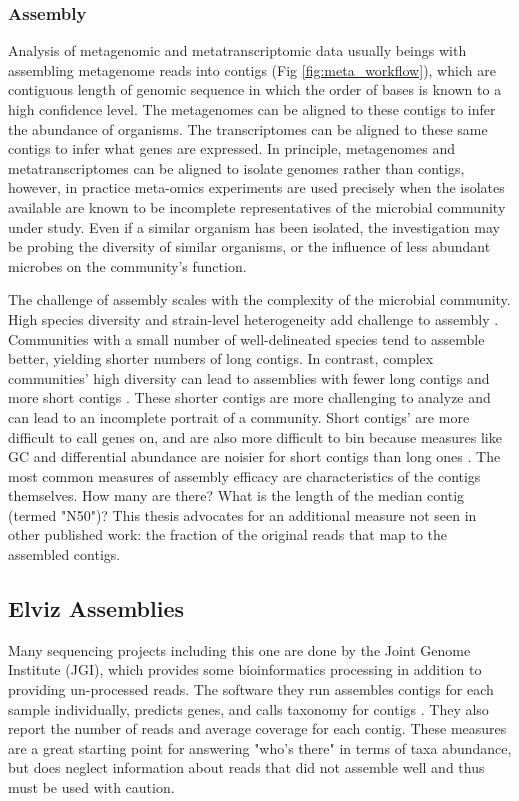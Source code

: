 \subsubsection{Assembly}
Analysis of metagenomic and metatranscriptomic data usually beings with assembling metagenome reads into contigs (Fig \ref{fig:meta_workflow}), which are contiguous length of genomic sequence in which the order of bases is known to a high confidence level. %
The metagenomes can be aligned to these contigs to infer the abundance of organisms.
The transcriptomes can be aligned to these same contigs to infer what genes are expressed.
In principle, metagenomes and metatranscriptomes can be aligned to isolate genomes rather than contigs, however, in practice meta-omics experiments are used precisely when the isolates available are known to be incomplete representatives of the microbial community under study.
Even if a similar organism has been isolated, the investigation may be probing the diversity of similar organisms, or the influence of less abundant microbes on the community's function.

The challenge of assembly scales with the complexity of the microbial community.
High species diversity and strain-level heterogeneity add challenge to assembly \cite{kunin2008, thomas2012}.
Communities with a small number of well-delineated species tend to assemble better, yielding shorter numbers of long contigs.
In contrast, complex communities' high diversity can lead to assemblies with fewer long contigs and more short contigs \cite{kunin2008}.
These shorter contigs are more challenging to analyze and can lead to an incomplete portrait of a community.
Short contigs' are more difficult to call genes on, and are also more difficult to bin because measures like GC and differential abundance are noisier for short contigs than long ones \cite{sangwan2016}.
The most common measures of assembly efficacy are characteristics of the contigs themselves.  How many are there?  What is the length of the median contig (termed "N50")?
This thesis advocates for an additional measure not seen in other published work: the fraction of the original reads that map to the assembled contigs.   %

\subsection{Elviz Assemblies}
Many sequencing projects including this one are done by the Joint Genome Institute (JGI), which provides some bioinformatics processing in addition to providing un-processed reads.
The software they run assembles contigs for each sample individually, predicts genes, and calls taxonomy for contigs \cite{cantor2015}.
They also report the number of reads and average coverage for each contig.
These measures are a great starting point for answering "who's there" in terms of taxa abundance, but does neglect information about reads that did not assemble well and thus must be used with caution.

